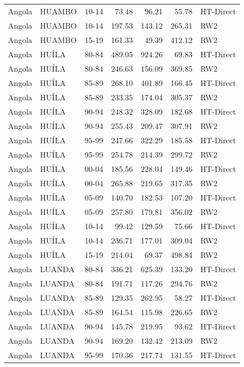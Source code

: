 \begin{longtable}{lllrrrl}
  Angola & HUAMBO & 10-14 & 73.48 & 96.21 & 55.78 & HT-Direct \\ 
  Angola & HUAMBO & 10-14 & 197.53 & 143.12 & 265.31 & RW2 \\ 
  Angola & HUAMBO & 15-19 & 161.33 & 49.39 & 412.12 & RW2 \\ 
  Angola & HUÍLA & 80-84 & 489.05 & 924.26 & 69.83 & HT-Direct \\ 
  Angola & HUÍLA & 80-84 & 246.63 & 156.09 & 369.85 & RW2 \\ 
  Angola & HUÍLA & 85-89 & 268.10 & 401.89 & 166.45 & HT-Direct \\ 
  Angola & HUÍLA & 85-89 & 233.35 & 174.04 & 305.37 & RW2 \\ 
  Angola & HUÍLA & 90-94 & 248.32 & 328.09 & 182.68 & HT-Direct \\ 
  Angola & HUÍLA & 90-94 & 255.43 & 209.47 & 307.91 & RW2 \\ 
  Angola & HUÍLA & 95-99 & 247.66 & 322.29 & 185.58 & HT-Direct \\ 
  Angola & HUÍLA & 95-99 & 254.78 & 214.39 & 299.72 & RW2 \\ 
  Angola & HUÍLA & 00-04 & 185.56 & 228.04 & 149.46 & HT-Direct \\ 
  Angola & HUÍLA & 00-04 & 265.88 & 219.65 & 317.35 & RW2 \\ 
  Angola & HUÍLA & 05-09 & 140.70 & 182.53 & 107.20 & HT-Direct \\ 
  Angola & HUÍLA & 05-09 & 257.80 & 179.81 & 356.02 & RW2 \\ 
  Angola & HUÍLA & 10-14 & 99.42 & 129.59 & 75.66 & HT-Direct \\ 
  Angola & HUÍLA & 10-14 & 236.71 & 177.01 & 309.04 & RW2 \\ 
  Angola & HUÍLA & 15-19 & 214.04 & 69.37 & 498.84 & RW2 \\ 
  Angola & LUANDA & 80-84 & 336.21 & 625.39 & 133.20 & HT-Direct \\ 
  Angola & LUANDA & 80-84 & 191.71 & 117.26 & 294.76 & RW2 \\ 
  Angola & LUANDA & 85-89 & 129.35 & 262.95 & 58.27 & HT-Direct \\ 
  Angola & LUANDA & 85-89 & 164.54 & 115.98 & 226.65 & RW2 \\ 
  Angola & LUANDA & 90-94 & 145.78 & 219.95 & 93.62 & HT-Direct \\ 
  Angola & LUANDA & 90-94 & 169.20 & 132.42 & 213.09 & RW2 \\ 
  Angola & LUANDA & 95-99 & 170.36 & 217.74 & 131.55 & HT-Direct \\ 

\end{longtable}
